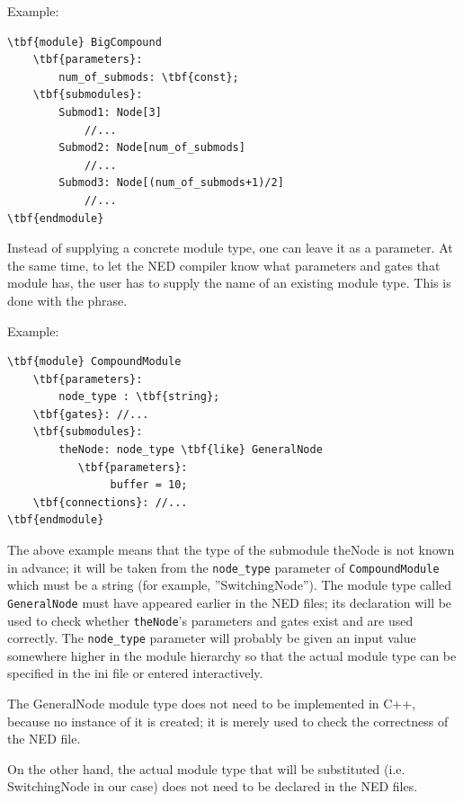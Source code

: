 Example:

\begin{Verbatim}[commandchars=\\\{\}]
\tbf{module} BigCompound
    \tbf{parameters}:
        num_of_submods: \tbf{const};
    \tbf{submodules}:
        Submod1: Node[3]
            //...
        Submod2: Node[num_of_submods]
            //...
        Submod3: Node[(num_of_submods+1)/2]
            //...
\tbf{endmodule}
\end{Verbatim}



Instead of supplying a concrete module type, one can leave it as a
parameter. At the same time, to let the NED compiler know what
parameters and gates that module has, the user has to supply the name
of an existing module type. This is done with the
 phrase.

Example:


\begin{Verbatim}[commandchars=\\\{\}]
\tbf{module} CompoundModule
    \tbf{parameters}:
        node_type : \tbf{string};
    \tbf{gates}: //...
    \tbf{submodules}:
        theNode: node_type \tbf{like} GeneralNode
           \tbf{parameters}:
                buffer = 10;
    \tbf{connections}: //...
\tbf{endmodule}
\end{Verbatim}

The above example means that the type of the submodule theNode is not
known in advance; it will be taken from the \texttt{node\_type}
parameter of \texttt{CompoundModule} which must be a string (for
example, ''SwitchingNode''). The module type called
\texttt{GeneralNode} must have appeared earlier in the NED files; its
declaration will be used to check whether \texttt{theNode}'s
parameters and gates exist and are used correctly. The
\texttt{node\_type} parameter will probably be given an input value
somewhere higher in the module hierarchy so that the actual module
type can be specified in the ini file or entered interactively.

The GeneralNode module type does not need to be implemented in 
C++, because no instance of it is created; it is merely used 
to check the correctness of the NED file. 

On the other hand, the actual module type that will be substituted 
(i.e. SwitchingNode in our case) does not need to be declared 
in the NED files.

